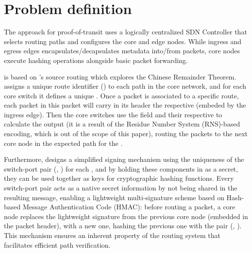 \section{Problem definition} \label{sec:definition} 



The \pathsec approach for proof-of-transit uses a logically centralized SDN Controller that selects routing paths and configures the core and edge nodes. While ingress and egress edges encapsulates/decapsulates metadata into/from packets, core nodes execute hashing operations alongside basic \polka packet forwarding.

\pathsec is based on \polka's source routing which explores the Chinese Remainder Theorem\cite{polka}.
\polka assigns a unique route identifier (\routeid) to each path in the core network, and for each core switch it defines a unique \nodeid. Once a packet is associated to a specific route, each packet in this packet  will carry in its header the respective \routeid (embeded by the ingress edge). Then the core switches use the \routeid field and their respective \nodeids to calculate the output \portid (it is a result of the Residue Number System (RNS)-based encoding\cite{pathsec}, which is out of the scope of this paper), routing the packets to the next core node in the expected path for the \routeid.

Furthermore, \pathsec designs a simplified signing mechanism using the uniqueness of the switch-port pair (\nodeid, \portid) for each \routeid, and by holding these components in as a secret, they can be used together as keys for cryptographic hashing functions. Every switch-port pair acts as a native secret information by not being shared in the resulting message, enabling a lightweight multi-signature scheme based on Hash-based Message Authentication Code (HMAC): before routing a packet, a core node replaces the lightweight signature from the previous core node (embedded in the packet header), with a new one, hashing the previous one with the pair (\nodeid, \portid). This mechanism ensures an inherent property of the routing system that facilitates efficient path verification. 



